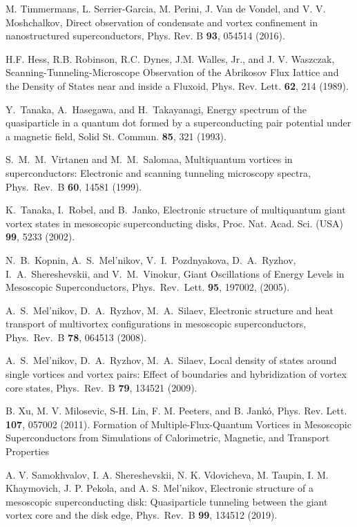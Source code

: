 \documentclass[prx,twocolumn,aps,superscriptaddress,showpacs,amsmath,amssymb,footnoteinbib]{revtex4-1}
\begin{document}
\begin{thebibliography}{99}
M. Timmermans, L. Serrier-Garcia, M. Perini, J. Van de Vondel, and
V. V. Moshchalkov, Direct observation of condensate and vortex
confinement in nanostructured superconductors, Phys. Rev. B {\bf
93}, 054514 (2016).

H.F. Hess, R.B. Robinson, R.C. Dynes, J.M. Walles,
Jr., and J. V. Waszczak, %
Scanning-Tunneling-Microscope Observation of the Abrikosov Flux
Iattice and the Density of States near and inside a Fluxoid, %
Phys. Rev. Lett. {\bf 62}, 214 (1989).

Y.\ Tanaka, A.\ Hasegawa, and H.\ Takayanagi, Energy spectrum of
the quasiparticle in a quantum dot formed by a superconducting
pair potential under a magnetic field, Solid St. Commun. {\bf 85},
321 (1993).

S.\ M.\ M.\ Virtanen and M.\ M.\ Salomaa, Multiquantum vortices in
superconductors: Electronic and scanning tunneling microscopy
spectra, Phys.\ Rev.\ B {\bf 60}, 14581 (1999).

K.\ Tanaka, I.\ Robel, and B.\ Janko, Electronic structure of
multiquantum giant vortex states in mesoscopic superconducting
disks,
 Proc. Nat. Acad. Sci. (USA) {\bf 99}, 5233 (2002).

N.\ B.\ Kopnin, A.\ S.\ Mel'nikov, V.\ I.\ Pozdnyakova, D.\ A.\
Ryzhov, I.\ A.\ Shereshevskii, and V.\ M.\ Vinokur, Giant
Oscillations of Energy Levels in Mesoscopic Superconductors,
Phys.\ Rev.\ Lett. {\bf 95}, 197002, (2005).

 A.\ S.\ Mel'nikov, D.\ A.\ Ryzhov, M.\ A.\ Silaev,
Electronic structure and heat transport of multivortex
configurations in mesoscopic superconductors, Phys.\ Rev.\ B {\bf
78}, 064513 (2008).

A.\ S.\ Mel'nikov, D.\ A.\ Ryzhov, M.\ A.\ Silaev, Local density
of states around single vortices and vortex pairs: Effect of
boundaries and hybridization of vortex core states, Phys.\ Rev.\ B
{\bf 79}, 134521 (2009).

B. Xu, M. V. Milosevic, S-H. Lin, F. M. Peeters, and B. Jank{\'o},
Phys. Rev. Lett. {\bf 107}, 057002 (2011). Formation of
Multiple-Flux-Quantum Vortices in Mesoscopic Superconductors from
Simulations of Calorimetric, Magnetic, and Transport Properties

A. V. Samokhvalov, I. A. Shereshevskii, N. K. Vdovicheva, M.
Taupin, I. M. Khaymovich, J. P. Pekola, and A. S. Mel'nikov,
Electronic structure of a mesoscopic superconducting disk:
Quasiparticle tunneling between the giant vortex core and the disk
edge, Phys.\ Rev.\ B {\bf 99}, 134512 (2019).


\end{thebibliography}
\end{document}
